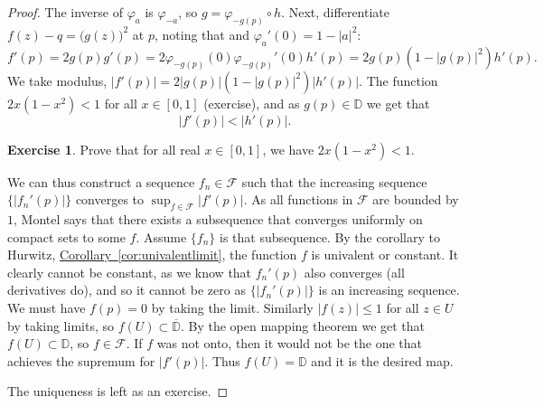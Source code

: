 \documentclass[12pt,openany]{book}
\newcommand{\sabs}[1]{\lvert {#1} \rvert}
\newcommand{\D}{{\mathbb{D}}}
\newcommand{\sF}{{\mathscr{F}}}
\theoremstyle{plain}
\theoremstyle{remark}
\theoremstyle{definition}
\newenvironment{exbox}{%
    \def\FrameCommand{\vrule width 1pt \relax\hspace {10pt}}%
    \MakeFramed {\advance \hsize -\width \FrameRestore }%
}{%
    \endMakeFramed
}
\theoremstyle{exercise}
\newtheorem{exercise}{Exercise}[section]
\theoremstyle{example}
\newcommand{\corref}[1]{\hyperref[#1]{Corollary~\ref*{#1}}}
\begin{document}
\begin{proof}
The inverse of $\varphi_a$ is $\varphi_{-a}$, so
$g = \varphi_{-g(p)} \circ h$.
Next, differentiate
$f(z)-q = {\bigl(g(z)\bigr)}^2$ at $p$, noting that
and $\varphi_a'(0) = 1-\sabs{a}^2$:
\begin{equation*}
f'(p) = 2 g(p) g'(p) = 2 \varphi_{-g(p)} (0) \varphi_{-g(p)}'(0) h'(p)  =
2 g(p) (1-\sabs{g(p)}^2) h'(p) .
\end{equation*}
We take modulus,
$\sabs{f'(p)} = 2 \sabs{g(p)} (1-\sabs{g(p)}^2) \sabs{h'(p)}$.  The function
$2x(1-x^2) < 1$ for all $x \in [0,1]$ (exercise), and as $g(p) \in \D$ we get that
\begin{equation*}
\sabs{f'(p)} < \sabs{h'(p)} .
\end{equation*}
\begin{exbox}
\begin{exercise}
Prove that for all real $x \in [0,1]$, we have $2x(1-x^2) < 1$.
\end{exercise}
\end{exbox}

We can thus construct a sequence $f_n \in \sF$ such that the increasing sequence
$\bigl\{ \sabs{f_n'(p)} \bigr\}$ converges to $\sup_{f \in \sF}
\sabs{f'(p)}$.  As all functions in $\sF$ are bounded by $1$,
Montel says that there exists a subsequence that converges uniformly on
compact sets to some $f$.  Assume $\{ f_n \}$ is that subsequence.
By the corollary to Hurwitz,
\corref{cor:univalentlimit},
the function $f$ is univalent or constant.  It clearly cannot be constant,
as we know that $f_n'(p)$ also converges (all derivatives do), and so it
cannot be zero as 
$\bigl\{ \sabs{f_n'(p)} \bigr\}$ is an increasing sequence.
We must have $f(p) = 0$ by taking the limit.
Similarly 
$\sabs{f(z)} \leq 1$ for all $z \in U$ by taking limits,
so $f(U) \subset \overline{\D}$.
By the open mapping theorem we get that $f(U) \subset \D$, so $f \in
\sF$.  If $f$ was not onto, then it would not be the one that achieves the
supremum for $\sabs{f'(p)}$.  Thus $f(U) = \D$ and it is the desired map.

The uniqueness is left as an exercise.
\end{proof}
\end{document}
